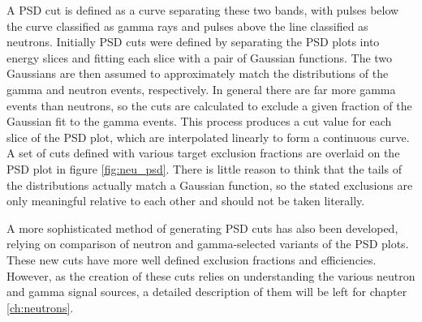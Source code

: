 A PSD cut is defined as a curve separating these two bands, with pulses below the curve classified as gamma rays and pulses above the line classified as neutrons.  
Initially PSD cuts were defined by separating the PSD plots into energy slices and fitting each slice with a pair of Gaussian functions.  
The two Gaussians are then assumed to approximately match the distributions of the gamma and neutron events, respectively.
In general there are far more gamma events than neutrons, so the cuts are calculated to exclude a given fraction of the Gaussian fit to the gamma events.
This process produces a cut value for each slice of the PSD plot, which are interpolated linearly to form a continuous curve.
A set of cuts defined with various target exclusion fractions are overlaid on the PSD plot in figure \ref{fig:neu_psd}.
There is little reason to think that the tails of the distributions actually match a Gaussian function, so the stated exclusions are only meaningful relative to each other and should not be taken literally. 

A more sophisticated method of generating PSD cuts has also been developed, relying on comparison of neutron and gamma-selected variants of the PSD plots.
These new cuts have more well defined exclusion fractions and efficiencies.
However, as the creation of these cuts relies on understanding the various neutron and gamma signal sources, a detailed description of them will be left for chapter \ref{ch:neutrons}.